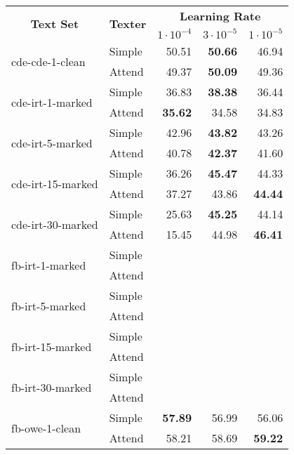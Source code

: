 \begin{tabular}{| l | l | r | r | r |}
    \hline

    \multicolumn{1}{|c|}{\multirow{2}{*}{\textbf{Text Set}}} &
    \multicolumn{1}{|c|}{\multirow{2}{*}{\textbf{Texter}}} &
    \multicolumn{3}{|c|}{\textbf{Learning Rate}} \\

    &
    &
    \multicolumn{1}{|c|}{\textbf{$1 \cdot 10^{-4}$}} &
    \multicolumn{1}{|c|}{\textbf{$3 \cdot 10^{-5}$}} &
    \multicolumn{1}{|c|}{\textbf{$1 \cdot 10^{-5}$}} \\

    \hline \hline

    \multirow{2}{*}{cde-cde-1-clean}
    & Simple & 50.51 & \textbf{50.66} & 46.94 \\
    & Attend & 49.37 & \textbf{50.09} & 49.36 \\ \hline

    \multirow{2}{*}{cde-irt-1-marked}
    & Simple & 36.83 & \textbf{38.38} & 36.44 \\
    & Attend & \textbf{35.62} & 34.58 & 34.83 \\ \hline

    \multirow{2}{*}{cde-irt-5-marked}
    & Simple & 42.96 & \textbf{43.82} & 43.26 \\
    & Attend & 40.78 & \textbf{42.37} & 41.60 \\ \hline

    \multirow{2}{*}{cde-irt-15-marked}
    & Simple & 36.26 & \textbf{45.47} & 44.33 \\
    & Attend & 37.27 & 43.86 & \textbf{44.44} \\ \hline

    \multirow{2}{*}{cde-irt-30-marked}
    & Simple & 25.63 & \textbf{45.25} & 44.14 \\
    & Attend & 15.45 & 44.98 & \textbf{46.41} \\ \hline \hline

    \multirow{2}{*}{fb-irt-1-marked}
    & Simple &  &  &  \\
    & Attend &  &  &  \\ \hline

    \multirow{2}{*}{fb-irt-5-marked}
    & Simple &  &  &  \\
    & Attend &  &  &  \\ \hline

    \multirow{2}{*}{fb-irt-15-marked}
    & Simple &  &  &  \\
    & Attend &  &  &  \\ \hline

    \multirow{2}{*}{fb-irt-30-marked}
    & Simple &  &  &  \\
    & Attend &  &  &  \\ \hline

    \multirow{2}{*}{fb-owe-1-clean}
    & Simple & \textbf{57.89} & 56.99 & 56.06 \\
    & Attend & 58.21 & 58.69 & \textbf{59.22} \\ \hline

\end{tabular}

